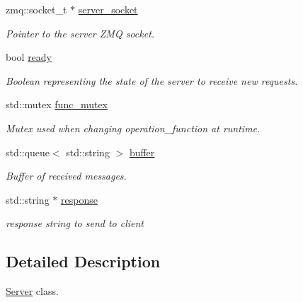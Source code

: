 \begin{DoxyCompactItemize}
zmq\-::socket\-\_\-t $\ast$ \hyperlink{classzcm_1_1Server_a4312bf38cfd6bb1d169d6bd3682651e3}{server\-\_\-socket}
\begin{DoxyCompactList}\small\item\em Pointer to the server Z\-M\-Q socket. \end{DoxyCompactList}\item 
bool \hyperlink{classzcm_1_1Server_a709ad2426e77a5e442d70a762cbe504b}{ready}
\begin{DoxyCompactList}\small\item\em Boolean representing the state of the server to receive new requests. \end{DoxyCompactList}\item 
std\-::mutex \hyperlink{classzcm_1_1Server_a3e36a37479457237786db9e163d6fef0}{func\-\_\-mutex}
\begin{DoxyCompactList}\small\item\em Mutex used when changing operation\-\_\-function at runtime. \end{DoxyCompactList}\item 
std\-::queue$<$ std\-::string $>$ \hyperlink{classzcm_1_1Server_adf539b811051ff12dba379c7a2816d0a}{buffer}
\begin{DoxyCompactList}\small\item\em Buffer of received messages. \end{DoxyCompactList}\item 
std\-::string $\ast$ \hyperlink{classzcm_1_1Server_a4bfa93eb7b4a1d42777b9f1a2326700f}{response}
\begin{DoxyCompactList}\small\item\em response string to send to client \end{DoxyCompactList}\end{DoxyCompactItemize}


\subsection{Detailed Description}
\hyperlink{classzcm_1_1Server}{Server} class. 

